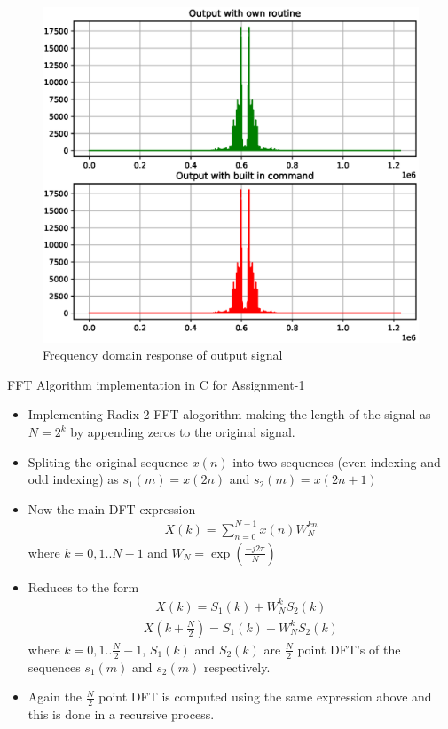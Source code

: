 \documentclass{beamer}
\begin{document}
\begin{frame}
\begin{figure}[!h]
\includegraphics[width=0.75\columnwidth]{./figs/ee18btech11034_2.eps}
\caption{Frequency domain response of output signal}
\label{fig:Figure2}
\end{figure}
\end{frame}
\begin{frame}{FFT Algorithm implementation in C for Assignment-1}
\begin{itemize}
\item Implementing Radix-2 FFT alogorithm making the length of the signal as $N = 2^k$ by appending zeros to the original signal.
\item Spliting the original sequence $x(n)$ into two sequences (even indexing and odd indexing) as $s_1(m) = x(2n)$ and $s_2(m) = x(2n+1)$
\item Now the main DFT expression 
\begin{align}
X(k) = \sum_{n=0}^{N-1} x(n) W_N^{kn} 
\end{align}
where $k=0,1..N-1$ and $W_N = \exp(\frac{-j2\pi}{N})$
\end{itemize}
\end{frame}
\begin{frame}
\begin{itemize}
\item Reduces to the form 
\begin{align}
X(k) = S_1(k) + W_N^kS_2(k)
\end{align}
\begin{align}
X(k+\frac{N}{2}) = S_1(k) - W_N^kS_2(k)
\end{align}
where $k=0,1..\frac{N}{2}-1$, $S_1(k)$ and $S_2(k)$ are $\frac{N}{2}$ point DFT's of the sequences $s_1(m)$ and $s_2(m)$ respectively.
\item Again the $\frac{N}{2}$ point DFT is computed using the same expression above and this is done in a recursive process. 
\end{itemize}
\end{frame}
\end{document}
